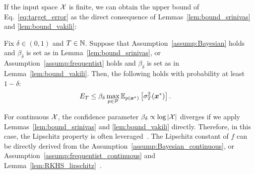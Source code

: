 %
If the input space ${\cal X}$ is finite, we can obtain the upper bound of Eq.~\eqref{eq:target_error} as the direct consequence of Lemmas~\ref{lem:bound_srinivas} and \ref{lem:bound_vakili}:
\begin{lemma}
    Fix $\delta \in (0, 1)$ and $T \in \mathbb{N}$.
    Suppose that Assumption~\ref{assump:Bayesian} holds and $\beta_\delta$ is set as in Lemma~\ref{lem:bound_srinivas}, or Assumption~\ref{assump:frequentist} holds and $\beta_\delta$ is set as in Lemma~\ref{lem:bound_vakili}.
    Then, the following holds with probability at least $1 - \delta$:
    \begin{align*}
        E_T &\leq \beta_{\delta} \max_{p \in {\cal P}} \mathbb{E}_{p(\boldsymbol{x}^{*})}\left[ \sigma^2_{T}(\boldsymbol{x}^{*}) \right].
    \end{align*}
    \label{lem:UB_error_discrete}
\end{lemma}


%
For continuous ${\cal X}$, the confidence parameter $\beta_\delta \propto \log |{\cal X}|$ diverges if we apply Lemmas~\ref{lem:bound_srinivas} and \ref{lem:bound_vakili} directly.
%
Therefore, in this case, the Lipschitz property is often leveraged~\citep{Chowdhury2017-on,vakili2021-optimal}.
%
The Lipschitz constant of $f$ can be directly derived from the Assumption~\ref{assump:Bayesian_continuous}, or Assumption~\ref{assump:frequentist_continuous} and Lemma~\ref{lem:RKHS_lipschitz}~\citep{Srinivas2010-Gaussian,freitas2012exponential}.


